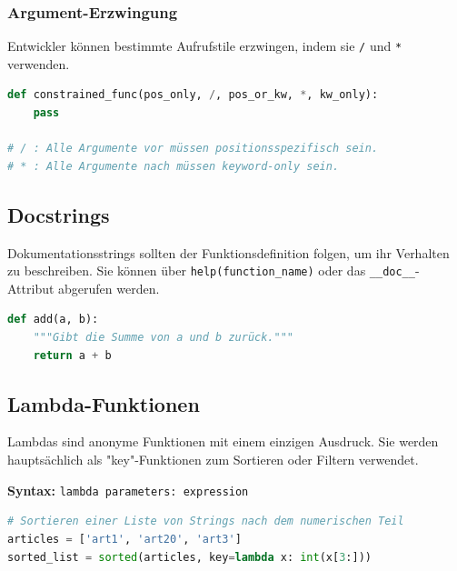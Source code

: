\subsubsection{Argument-Erzwingung}
Entwickler können bestimmte Aufrufstile erzwingen, indem sie \texttt{/} und \texttt{*} verwenden.

\begin{lstlisting}[language=Python]
def constrained_func(pos_only, /, pos_or_kw, *, kw_only):
    pass

# / : Alle Argumente vor müssen positionsspezifisch sein.
# * : Alle Argumente nach müssen keyword-only sein.
\end{lstlisting}

\subsection{Docstrings}
Dokumentationsstrings sollten der Funktionsdefinition folgen, um ihr Verhalten zu beschreiben. Sie können über \texttt{help(function\_name)} oder das \texttt{\_\_doc\_\_}-Attribut abgerufen werden.

\begin{lstlisting}[language=Python]
def add(a, b):
    """Gibt die Summe von a und b zurück."""
    return a + b
\end{lstlisting}

\subsection{Lambda-Funktionen}
Lambdas sind anonyme Funktionen mit einem einzigen Ausdruck. Sie werden hauptsächlich als "key"-Funktionen zum Sortieren oder Filtern verwendet.

\textbf{Syntax:} \texttt{lambda parameters: expression}

\begin{lstlisting}[language=Python]
# Sortieren einer Liste von Strings nach dem numerischen Teil
articles = ['art1', 'art20', 'art3']
sorted_list = sorted(articles, key=lambda x: int(x[3:]))
\end{lstlisting}